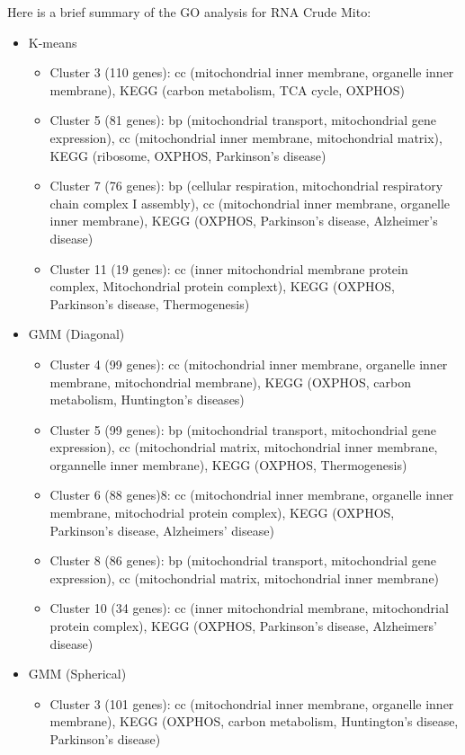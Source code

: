 Here is a brief summary of the GO analysis for RNA Crude Mito:
\begin{itemize}
	\item K-means
	\begin{itemize}
		\item Cluster 3 (110 genes): cc (mitochondrial inner membrane, organelle inner membrane), KEGG (carbon metabolism, TCA cycle, OXPHOS)
		\item Cluster 5 (81 genes): bp (mitochondrial transport, mitochondrial gene expression), cc (mitochondrial inner membrane, mitochondrial matrix), KEGG (ribosome, OXPHOS, Parkinson's disease)		
		\item Cluster 7 (76 genes): bp (cellular respiration, mitochondrial respiratory chain complex I assembly), cc (mitochondrial inner membrane, organelle inner membrane), KEGG (OXPHOS, Parkinson's disease, Alzheimer's disease)
		\item Cluster 11 (19 genes): cc (inner mitochondrial membrane protein complex, Mitochondrial protein complext), KEGG (OXPHOS, Parkinson's disease, Thermogenesis)
	\end{itemize}
	\item GMM (Diagonal)
	\begin{itemize}
		\item Cluster 4 (99 genes): cc (mitochondrial inner membrane, organelle inner membrane, mitochondrial membrane), KEGG (OXPHOS, carbon metabolism, Huntington's diseases)
		\item Cluster 5 (99 genes): bp (mitochondrial transport, mitochondrial gene expression), cc (mitochondrial matrix, mitochondrial inner membrane, organnelle inner membrane), KEGG (OXPHOS, Thermogenesis)
		\item Cluster 6 (88 genes)8: cc (mitochondrial inner membrane, organelle inner membrane, mitochodrial protein complex), KEGG (OXPHOS, Parkinson's disease, Alzheimers' disease)
		\item Cluster 8 (86 genes): bp (mitochondrial transport, mitochondrial gene expression), cc (mitochondrial matrix, mitochondrial inner membrane)
		\item Cluster 10 (34 genes): cc (inner mitochondrial membrane, mitochondrial protein complex), KEGG (OXPHOS, Parkinson's disease, Alzheimers' disease)
	\end{itemize}
	\item GMM (Spherical)
	\begin{itemize}
		\item Cluster 3 (101 genes): cc (mitochondrial inner membrane, organelle inner membrane), KEGG (OXPHOS, carbon metabolism, Huntington's disease, Parkinson's disease)		

\end{itemize}
\end{itemize}
